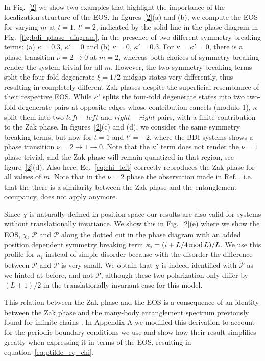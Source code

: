 \documentclass[twocolumn,amsmath,longbibliography,amssymb,superscriptaddress]{revtex4-1}
\begin{document}
In Fig.~\ref{2} we show two examples that highlight the importance of the localization structure of the EOS. 
In figures~\ref{2}(a) and (b), we compute the EOS for varying $m$ at  $t=1$, $t'=2$, indicated by the solid line  in the phase-diagram in Fig.~\ref{fig:bdi_phase_diagram}, in the presence of two different symmetry breaking terms: (a) $\kappa =0.3$, $\kappa'=0$ and (b) $\kappa=0$, $\kappa'=0.3$.  
For $\kappa=\kappa'=0$, there is a phase transition $\nu = 2 \rightarrow 0 $ at $m=2$, whereas both choices of symmetry breaking render the system trivial  for all $m$.
However, the two symmetry breaking terms split the four-fold degenerate $\xi=1/2$ midgap states very differently, thus resulting in completely different Zak phases despite the superficial resemblance of their respective EOS.  
While $\kappa'$ splits the four-fold degenerate states into two two-fold degenerate pairs at opposite edges whose contribution cancels (modulo 1), $\kappa$ split them into two $left-left$ and $right-right$ pairs, with a finite contribution to the Zak phase. 
In figures~\ref{2}(c) and (d), we consider the same symmetry breaking terms, but now for $t=1$ and $t'=-2$, where the BDI systems shows a phase transition  $\nu=2\rightarrow 1\rightarrow 0$. 
Note that the $\kappa'$ term does not render the $\nu=1$ phase trivial, and the Zak phase will remain quantized in that region, see figure~\ref{2}(d). 
Also here, Eq.~\eqref{eq:chi_left} correctly reproduces the Zak phase for all values of $m$. 
Note that in the $\nu=2$ phase the observation made in Ref. \cite{Huang2012}, i.e. that the there is a similarity between the Zak phase and the entanglement occupancy, does not apply anymore. 

Since $\chi$ is naturally defined in position space our results are also valid for systems without translationally invariance. We show this in Fig.~\ref{2}(e) where we show the EOS, $\chi$, $\mathcal{P}$ and $\tilde{\mathcal{P}}$ along the dotted cut in the phase diagram with an added position dependent symmetry breaking term $\kappa_i = (i+L/4 \, {\rm mod}\, L)/L$. We use this profile for $\kappa_i$ instead of simple disorder because with the disorder the difference between $\mathcal{P}$ and $\tilde{\mathcal{P}}$ is very small. We obtain that $\chi$ is indeed identified with $\tilde{\mathcal{P}}$ as we hinted at before, and not $\mathcal{P}$, although these two polarization only differ by $(L+1)/2$ in the translationally invariant case for this model. 


This relation between the Zak phase and the EOS is a consequence of an identity between the Zak phase and the many-body entanglement spectrum previously found for infinite chains \cite{Zaletel2014}. In Appendix A we modified this derivation to account for the periodic boundary conditions we use and show how their result simplifies greatly when expressing it in terms of the EOS, resulting in equation~\eqref{eq:ptilde_eq_chi}.
\end{document}
